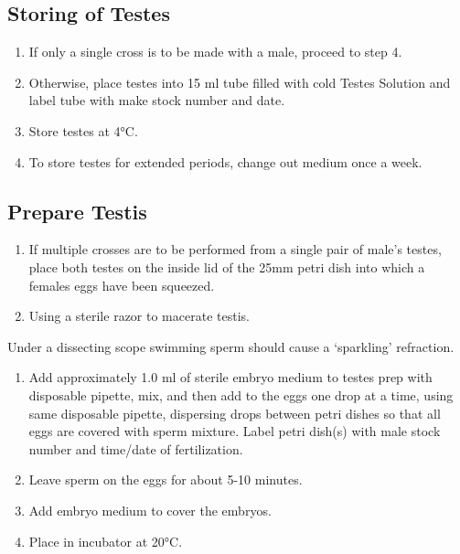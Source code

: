 \documentclass[
  letterpaper,
  DIV=11,
  numbers=noendperiod]{scrreprt}
\providecommand{\tightlist}{%
  \setlength{\itemsep}{0pt}\setlength{\parskip}{0pt}}\usepackage{longtable,booktabs,array}
\begin{document}
\hypertarget{storing-of-testes}{%
\subsection{Storing of Testes}\label{storing-of-testes}}

\begin{enumerate}
\def\labelenumi{\arabic{enumi}.}
\setcounter{enumi}{11}
\tightlist
\item
  If only a single cross is to be made with a male, proceed to step 4.
\item
  Otherwise, place testes into 15 ml tube filled with cold Testes
  Solution and label tube with make stock number and date.
\item
  Store testes at 4°C.
\item
  To store testes for extended periods, change out medium once a week.
\end{enumerate}

\hypertarget{prepare-testis}{%
\subsection{Prepare Testis}\label{prepare-testis}}

\begin{enumerate}
\def\labelenumi{\arabic{enumi}.}
\setcounter{enumi}{15}
\tightlist
\item
  If multiple crosses are to be performed from a single pair of male's
  testes, place both testes on the inside lid of the 25mm petri dish
  into which a females eggs have been squeezed.
\item
  Using a sterile razor to macerate testis.
\end{enumerate}

Under a dissecting scope swimming sperm should cause a `sparkling'
refraction.

\begin{enumerate}
\def\labelenumi{\arabic{enumi}.}
\setcounter{enumi}{17}
\item
  Add approximately 1.0 ml of sterile embryo medium to testes prep with
  disposable pipette, mix, and then add to the eggs one drop at a time,
  using same disposable pipette, dispersing drops between petri dishes
  so that all eggs are covered with sperm mixture. Label petri dish(s)
  with male stock number and time/date of fertilization.
\item
  Leave sperm on the eggs for about 5-10 minutes.
\item
  Add embryo medium to cover the embryos.
\item
  Place in incubator at 20°C.
\end{enumerate}
\end{document}
